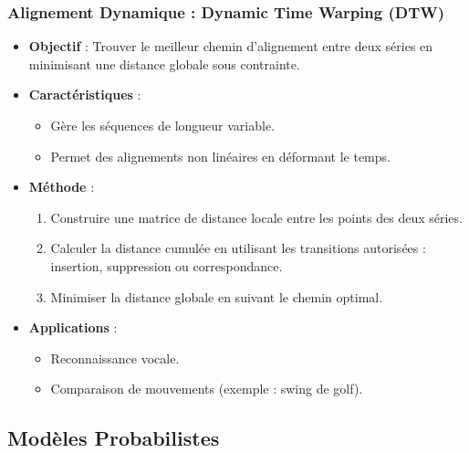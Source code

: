 \documentclass[a4paper,12pt,oneside]{report}	%
\begin{document}
            \subsubsection{Alignement Dynamique : Dynamic Time Warping (DTW)}
                \begin{itemize}
                    \item \textbf{Objectif} : Trouver le meilleur chemin d’alignement entre deux séries en minimisant une distance globale sous contrainte.
                    \item \textbf{Caractéristiques} :
                        \begin{itemize}
                            \item Gère les séquences de longueur variable.
                            \item Permet des alignements non linéaires en déformant le temps.
                        \end{itemize}
                    \item \textbf{Méthode} :
                \begin{enumerate}
                    \item Construire une matrice de distance locale entre les points des deux séries.
                    \item Calculer la distance cumulée en utilisant les transitions autorisées : insertion, suppression ou correspondance.
                    \item Minimiser la distance globale en suivant le chemin optimal.
                \end{enumerate}
                \item \textbf{Applications} :
                \begin{itemize}
                    \item Reconnaissance vocale.
                    \item Comparaison de mouvements (exemple : swing de golf).
                \end{itemize}
            \end{itemize}
        \subsection{Modèles Probabilistes}
\end{document}
